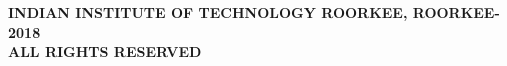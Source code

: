 \thispagestyle{empty}
\vspace*{80mm}
{
 \begin{center}
 \bfseries{}\selectfont \textcopyright INDIAN INSTITUTE OF TECHNOLOGY ROORKEE, ROORKEE-2018\\\vspace{-01ex}ALL RIGHTS RESERVED 
 \end{center}
}

